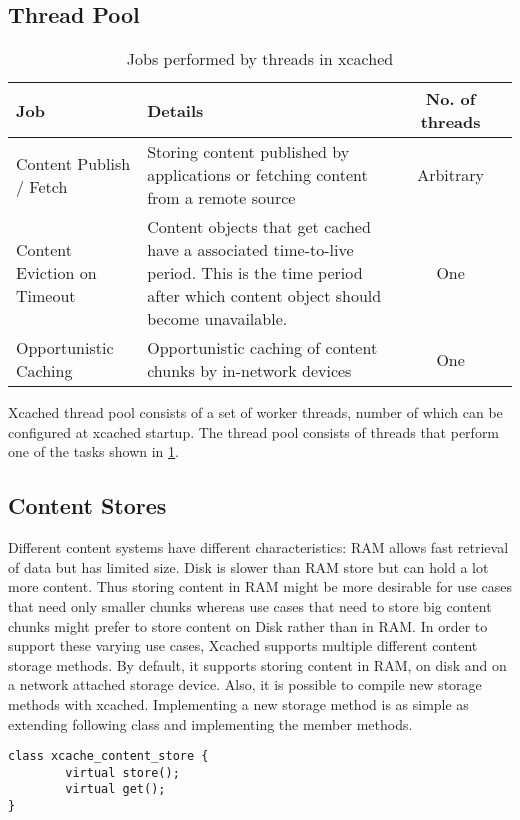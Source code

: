 \subsection{Thread Pool}
\begin{table}
  \begin{center}
    \begin{tabular}
      { p{1in} | p{2.5in} | cp{0.5in} |}
      Job & Details & No. of threads \\
      \hline
      Content Publish / Fetch & Storing content published by applications or fetching content from a remote source &  Arbitrary\\
      \hline
      Content Eviction on Timeout & Content objects that get cached have a associated time-to-live period. This is the time period after which content object should become unavailable. & One \\
      \hline
      Opportunistic Caching & Opportunistic caching of content chunks
      by in-network devices & One\\
    \end{tabular}
  \end{center}
  \caption{Jobs performed by threads in xcached}
  \label{tab:threads}
\end{table}
Xcached thread pool consists of a set of worker threads, number of
which can be configured at xcached startup. The thread pool consists
of threads that perform one of the tasks shown in \ref{tab:threads}.
\subsection{Content Stores}
Different content systems have different characteristics: RAM allows
fast retrieval of data but has limited size. Disk is slower than RAM
store but can hold a lot more content. Thus storing content in RAM
might be more desirable for use cases that need only smaller chunks
whereas use cases that need to store big content chunks might prefer
to store content on Disk rather than in RAM. In order to support these
varying use cases, Xcached supports multiple different content storage
methods. By default, it supports storing content in RAM, on disk and
on a network attached storage device. Also, it is possible to compile
new storage methods with xcached. Implementing a new storage method is
as simple as extending following class and implementing the member
methods.

{
\begin{verbatim}
class xcache_content_store {
        virtual store();
        virtual get();
}
\end{verbatim}
}

